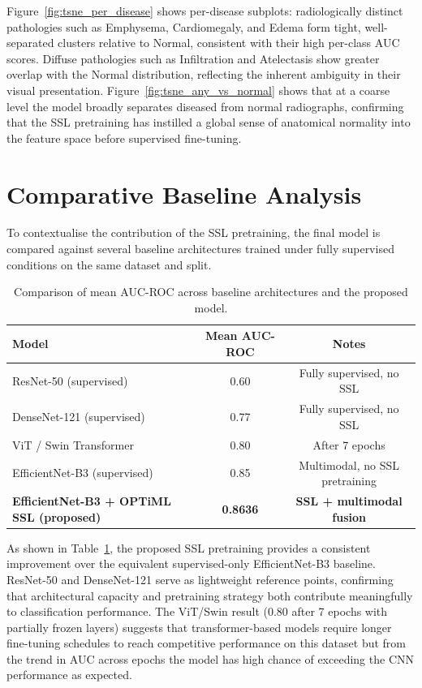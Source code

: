 Figure~\ref{fig:tsne_per_disease} shows per-disease subplots: radiologically distinct pathologies such as Emphysema, Cardiomegaly, and Edema form tight, well-separated clusters relative to Normal, consistent with their high per-class AUC scores. Diffuse pathologies such as Infiltration and Atelectasis show greater overlap with the Normal distribution, reflecting the inherent ambiguity in their visual presentation. Figure~\ref{fig:tsne_any_vs_normal} shows that at a coarse level the model broadly separates diseased from normal radiographs, confirming that the SSL pretraining has instilled a global sense of anatomical normality into the feature space before supervised fine-tuning.

\section{Comparative Baseline Analysis}
\label{sec:baselines}

To contextualise the contribution of the SSL pretraining, the final model is compared against several baseline architectures trained under fully supervised conditions on the same dataset and split.

\begin{table}[ht]
\centering
\caption{Comparison of mean AUC-ROC across baseline architectures and the proposed model.}
\label{tab:baselines}
\renewcommand{\arraystretch}{1.4}
\begin{tabular}{lcc}
\toprule
\textbf{Model} & \textbf{Mean AUC-ROC} & \textbf{Notes} \\
\midrule
ResNet-50 (supervised)          & 0.60  & Fully supervised, no SSL \\
DenseNet-121 (supervised)       & 0.77  & Fully supervised, no SSL \\
ViT / Swin Transformer          & 0.80             & After 7 epochs\\
EfficientNet-B3 (supervised)    & 0.85  & Multimodal, no SSL pretraining \\
\midrule
\rowcolor{green!15}
\textbf{EfficientNet-B3 + OPTiML SSL (proposed)} & \textbf{0.8636} & \textbf{SSL + multimodal fusion} \\
\bottomrule
\end{tabular}
\end{table}

As shown in Table~\ref{tab:baselines}, the proposed SSL pretraining provides a consistent improvement over the equivalent supervised-only EfficientNet-B3 baseline. ResNet-50 and DenseNet-121 serve as lightweight reference points, confirming that architectural capacity and pretraining strategy both contribute meaningfully to classification performance. The ViT/Swin result (0.80 after 7 epochs with partially frozen layers) suggests that transformer-based models require longer fine-tuning schedules to reach competitive performance on this dataset but from the trend in AUC across epochs the model has high chance of exceeding the CNN performance as expected.

